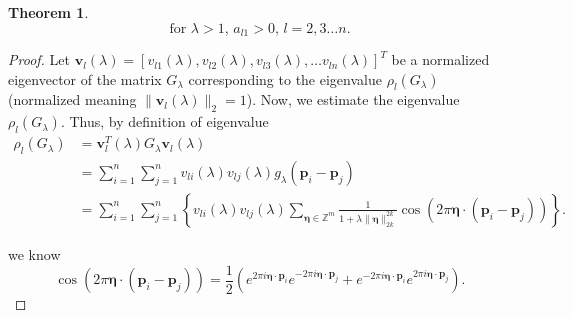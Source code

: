 \documentclass[multixcb]{amstext-l}
\theoremstyle{plain}
\newtheorem{theorem}{Theorem}[chapter]
\theoremstyle{definition}
\theoremstyle{definition}
\theoremstyle{remark}
\numberwithin{equation}{chapter}
\begin{document}
\begin{theorem}\label{eig_theorem}
 $$\mbox{for    }\lambda>1\mbox{,          } a_{l1} > 0 \mbox{,         } l= 2,3\ldots n.$$ 
\end{theorem}
\begin{proof}
Let $\boldsymbol{v}_l(\lambda) = [v_{l1}(\lambda),v_{l2}(\lambda),v_{l3}(\lambda),\ldots v_{ln}(\lambda)]^T$ be a normalized eigenvector of the matrix $G_{\lambda}$ corresponding to the eigenvalue $\rho_l(G_{\lambda})$ (normalized meaning $\|\boldsymbol{v}_l(\lambda)\|_2=1$). Now, we estimate the eigenvalue $\rho_l(G_{\lambda})$. Thus, by definition of eigenvalue 
\begin{equation}\label{eigest}
\begin{aligned}
    \rho_l(G_{\lambda}) &= \boldsymbol{v}_l^T(\lambda)G_{\lambda}\boldsymbol{v}_l(\lambda)\\
    &= \sum\limits_{i=1}^n\sum\limits_{j=1}^nv_{li}(\lambda)v_{lj}(\lambda)g_{\lambda}(\boldsymbol{p}_i-\boldsymbol{p}_j)\\
    &= \sum\limits_{i=1}^n\sum\limits_{j=1}^n\left\{v_{li}(\lambda)v_{lj}(\lambda)\sum_{\boldsymbol{\eta}\in\mathbb{Z}^m} \frac{1}{1+\lambda\|\boldsymbol{\eta}\|_{2k}^{2k}} \cos{(2\pi\boldsymbol{\eta}\cdot(\boldsymbol{p}_i-\boldsymbol{p}_j))}\right\}.
\end{aligned}
\end{equation} 

we know \begin{equation}\label{dmoiver}
    \cos{(2\pi\boldsymbol{\eta}\cdot(\boldsymbol{p}_i-\boldsymbol{p}_j))} = \frac{1}{2}\left(e^{2\pi i \boldsymbol{\eta}\cdot\boldsymbol{p}_i } e^{-2\pi i \boldsymbol{\eta}\cdot\boldsymbol{p}_j} + e^{-2\pi i \boldsymbol{\eta}\cdot\boldsymbol{p}_i } e^{2\pi i \boldsymbol{\eta}\cdot\boldsymbol{p}_j}\right). 
\end{equation}


\end{proof}
\end{document}

